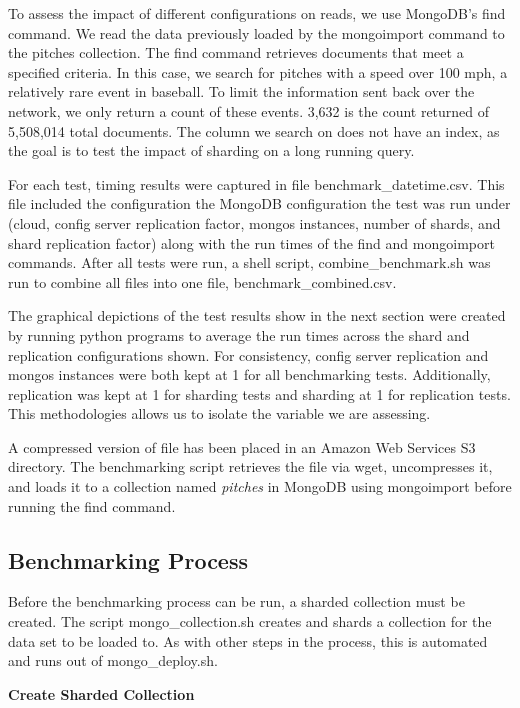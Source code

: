 \documentclass[9pt,twocolumn,twoside]{styles/osajnl}
\begin{document}
To assess the impact of different configurations on reads, we use MongoDB's find command.  We read the data previously loaded by the mongoimport command to the pitches collection.  The find command retrieves documents that meet a specified criteria.  In this case, we search for pitches with a speed over 100 mph, a relatively rare event in baseball.  To limit the information sent back over the network, we only return a count of these events.  3,632 is the count returned of 5,508,014 total documents.  The column we search on does not have an index, as the goal is to test the impact of sharding on a long running query.


For each test, timing results were captured in file benchmark\_datetime.csv.  This file included the configuration the MongoDB configuration the test was run under (cloud, config server replication factor, mongos instances, number of shards, and shard replication factor) along with the run times of the find and mongoimport commands.  After all tests were run, a shell script, combine\_benchmark.sh was run to combine all files into one file, benchmark\_combined.csv.

The graphical depictions of the test results show in the next section were created by running python programs to average the run times across the shard and replication configurations shown.  For consistency, config server replication and mongos instances were both kept at 1 for all benchmarking tests.  Additionally, replication was kept at 1 for sharding tests and sharding at 1 for replication tests.  This methodologies allows us to isolate the variable we are assessing.



A compressed version of file has been placed in an Amazon Web Services S3 directory.  The benchmarking script retrieves the file via wget, uncompresses it, and loads it to a collection named \emph{pitches} in MongoDB using mongoimport before running the find command.


\subsection{Benchmarking Process}

Before the benchmarking process can be run, a sharded collection must be created.  The script mongo\_collection.sh creates and shards a collection for the data set to be loaded to.  As with other steps in the process, this is automated and runs out of mongo\_deploy.sh.

\textbf{Create Sharded Collection}
\end{document}

